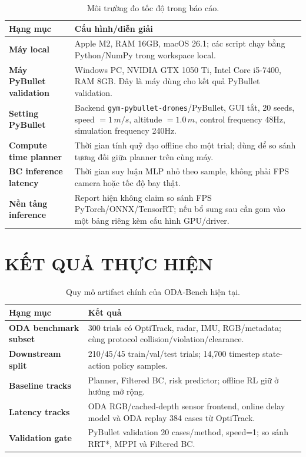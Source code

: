 \documentclass[10pt,letterpaper,twocolumn]{article}
\newcommand{\code}[1]{\texttt{#1}}
\begin{document}
\begin{table}[!t]
\centering
\footnotesize
\caption{Môi trường đo tốc độ trong báo cáo.}
\label{tab:runtime-env}
\begin{tabularx}{\columnwidth}{>{\bfseries}p{2.35cm} X}
\toprule
Hạng mục & Cấu hình/diễn giải \\
\midrule
Máy local & Apple M2, RAM 16GB, macOS 26.1; các script chạy bằng Python/NumPy trong workspace local. \\
Máy PyBullet validation & Windows PC, NVIDIA GTX 1050 Ti, Intel Core i5-7400, RAM 8GB. Đây là máy dùng cho kết quả PyBullet validation. \\
Setting PyBullet & Backend \code{gym-pybullet-drones}/PyBullet, GUI tắt, 20 seeds, speed \(=1\,m/s\), altitude \(=1.0\,m\), control frequency 48Hz, simulation frequency 240Hz. \\
Compute time planner & Thời gian tính quỹ đạo offline cho một trial; dùng để so sánh tương đối giữa planner trên cùng máy. \\
BC inference latency & Thời gian suy luận MLP nhỏ theo sample, không phải FPS camera hoặc tốc độ bay thật. \\
Nền tảng inference & Report hiện không claim so sánh FPS PyTorch/ONNX/TensorRT; nếu bổ sung sau cần gom vào một bảng riêng kèm cấu hình GPU/driver. \\
\bottomrule
\end{tabularx}
\end{table}

\section{KẾT QUẢ THỰC HIỆN}
\begin{table}[!t]
\centering
\footnotesize
\caption{Quy mô artifact chính của ODA-Bench hiện tại.}
\label{tab:artifacts}
\begin{tabularx}{\columnwidth}{>{\bfseries}p{2.45cm} X}
\toprule
Hạng mục & Kết quả \\
\midrule
ODA benchmark subset & 300 trials có OptiTrack, radar, IMU, RGB/metadata; cùng protocol collision/violation/clearance. \\
Downstream split & 210/45/45 train/val/test trials; 14,700 timestep state-action policy samples. \\
Baseline tracks & Planner, Filtered BC, risk predictor; offline RL giữ ở hướng mở rộng. \\
Latency tracks & ODA RGB/cached-depth sensor frontend, online delay model và ODA replay 384 cases từ OptiTrack. \\
Validation gate & PyBullet validation 20 cases/method, speed=1; so sánh RRT*, MPPI và Filtered BC. \\
\bottomrule
\end{tabularx}
\end{table}
\end{document}
